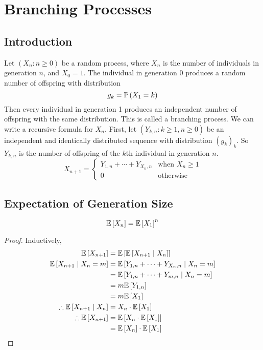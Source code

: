 \documentclass{article}
\begin{document}
\section{Branching Processes}
\subsection{Introduction}
Let $(X_n \colon n \geq 0)$ be a random process, where $X_n$ is the number of individuals in generation $n$, and $X_0 = 1$. The individual in generation 0 produces a random number of offspring with distribution
\[ g_k = \mathbb{P}\left({X_1 = k}\right) \]
Then every individual in generation 1 produces an independent number of offspring with the same distribution. This is called a branching process. We can write a recursive formula for $X_n$. First, let $(Y_{k, n} \colon k \geq 1, n \geq 0)$ be an independent and identically distributed sequence with distribution $(g_k)_k$. So $Y_{k, n}$ is the number of offspring of the $k$th individual in generation $n$.
\[ X_{n+1} = \begin{cases}
		Y_{1,n} + \cdots + Y_{X_n,n} & \text{when } X_n \geq 1 \\
		0                            & \text{otherwise}
	\end{cases} \]

\subsection{Expectation of Generation Size}
\begin{theorem}
	\[ \mathbb{E}\left[{X_n}\right] = \mathbb{E}\left[{X_1}\right]^n \]
\end{theorem}
\begin{proof}
	Inductively,
	\begin{align*}
		\mathbb{E}\left[{X_{n+1}}\right]                     & = \mathbb{E}\left[{\mathbb{E}\left[{X_{n+1} \mid X_n}\right]}\right]                 \\
		\mathbb{E}\left[{X_{n+1} \mid X_n = m}\right]        & = \mathbb{E}\left[{Y_{1,n} + \cdots + Y_{X_n,n} \mid X_n = m}\right] \\
		                                     & = \mathbb{E}\left[{Y_{1,n} + \cdots + Y_{m,n} \mid X_n = m}\right]   \\
		                                     & = m \mathbb{E}\left[{Y_{1,n}}\right]                                 \\
		                                     & = m \mathbb{E}\left[{X_1}\right]                                     \\
		\therefore \mathbb{E}\left[{X_{n+1} \mid X_n}\right] & = X_n \cdot \mathbb{E}\left[{X_1}\right]                             \\
		\therefore \mathbb{E}\left[{X_{n+1}}\right]          & = \mathbb{E}\left[{X_n \cdot \mathbb{E}\left[{X_1}\right]}\right]                    \\
		                                     & = \mathbb{E}\left[{X_n}\right] \cdot \mathbb{E}\left[{X_1}\right]
	\end{align*}
\end{proof}
\end{document}
